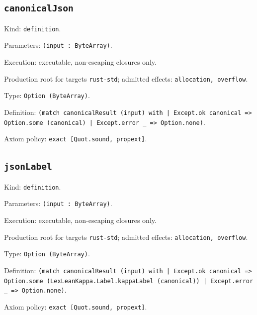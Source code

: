 \documentclass[11pt]{article}
\begin{document}
\subsection*{\texttt{canonicalJson}}
\noindent Kind: \texttt{definition}.\par
\noindent Parameters: \texttt{(input : ByteArray)}.\par
\noindent Execution: executable, non-escaping closures only.\par
\noindent Production root for targets \texttt{rust-std}; admitted effects: \texttt{allocation, overflow}.\par
\noindent Type: \texttt{Option (ByteArray)}.\par
\noindent Definition: \texttt{(match canonicalResult (input) with | Except.ok canonical => Option.some (canonical) | Except.error \_ => Option.none)}.\par
\noindent Axiom policy: \texttt{exact [Quot.sound, propext]}.\par
\subsection*{\texttt{jsonLabel}}
\noindent Kind: \texttt{definition}.\par
\noindent Parameters: \texttt{(input : ByteArray)}.\par
\noindent Execution: executable, non-escaping closures only.\par
\noindent Production root for targets \texttt{rust-std}; admitted effects: \texttt{allocation, overflow}.\par
\noindent Type: \texttt{Option (ByteArray)}.\par
\noindent Definition: \texttt{(match canonicalResult (input) with | Except.ok canonical => Option.some (LexLeanKappa.Label.kappaLabel (canonical)) | Except.error \_ => Option.none)}.\par
\noindent Axiom policy: \texttt{exact [Quot.sound, propext]}.\par
\end{document}
